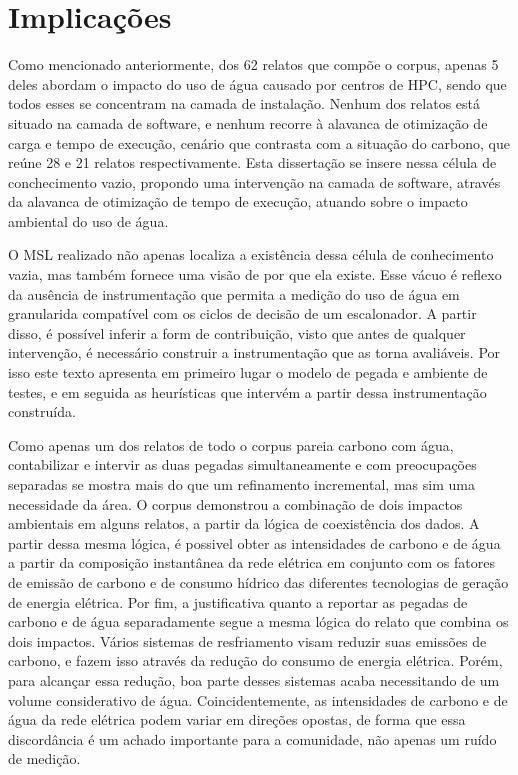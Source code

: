 \section{Implicações}

Como mencionado anteriormente, dos 62 relatos que compõe o corpus, apenas 5 deles abordam o impacto do uso de água
causado por centros de HPC, sendo que todos esses se concentram na camada de instalação. Nenhum dos relatos está
situado na camada de software, e nenhum recorre à alavanca de otimização de carga e tempo de execução, cenário que 
contrasta com a situação do carbono, que reúne 28 e 21 relatos respectivamente. Esta dissertação se insere nessa
célula de conchecimento vazio, propondo uma intervenção na camada de software, através da alavanca de otimização
de tempo de execução, atuando sobre o impacto ambiental do uso de água. 

O MSL realizado não apenas localiza a existência dessa célula de conhecimento vazia, mas também fornece uma visão
de por que ela existe. Esse vácuo é reflexo da ausência de instrumentação que permita a medição do uso de água 
em granularida compatível com os ciclos de decisão de um escalonador. A partir disso, é possível inferir 
a form de contribuição, visto que antes de qualquer intervenção, é necessário construir a instrumentação 
que as torna avaliáveis. Por isso este texto apresenta em primeiro lugar o modelo de pegada e ambiente de testes,
e em seguida as heurísticas que intervém a partir dessa instrumentação construída. 

Como apenas um dos relatos de todo o corpus pareia carbono com água, contabilizar e intervir as duas pegadas simultaneamente
e com preocupações separadas se mostra mais do que um refinamento incremental, mas sim uma necessidade da área. O corpus demonstrou
a combinação de dois impactos ambientais em alguns relatos, a partir da lógica de coexistência dos dados. A partir dessa mesma
lógica, é possivel obter as intensidades de carbono e de água a partir da composição instantânea da rede elétrica
em conjunto com os fatores de emissão de carbono e de consumo hídrico das diferentes tecnologias de geração de energia
elétrica.  Por fim, a justificativa quanto a reportar as pegadas de carbono e de água separadamente segue a mesma 
lógica do relato que combina os dois impactos. Vários sistemas de resfriamento visam reduzir suas emissões de carbono,
e fazem isso através da redução do consumo de energia elétrica. Porém, para alcançar essa redução, boa parte desses sistemas
acaba necessitando de um volume considerativo de água. Coincidentemente, as intensidades de carbono e de água da rede
elétrica podem variar em direções opostas, de forma que essa discordância é um achado importante para a comunidade,
não apenas um ruído de medição.


